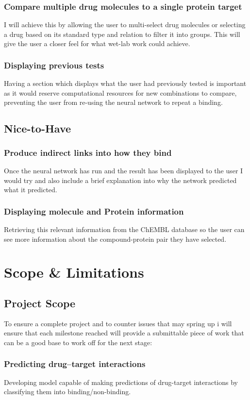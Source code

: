 \subsubsection{Compare multiple drug molecules to a single protein target}
I will achieve this by allowing the user to multi-select drug molecules or selecting a drug based on its standard type and relation to filter it into groups. This will give the user a closer feel for what wet-lab work could achieve.
\subsubsection{Displaying previous tests}
Having a section which displays what the user had previously tested is important as it would reserve computational resources for new combinations to compare, preventing the user from re-using the neural network to repeat a binding.


\subsection{Nice-to-Have}
\subsubsection{Produce indirect links into how they bind}
Once the neural network has run and the result has been displayed to the user I would try and also include a brief explanation into why the network predicted what it predicted.
\subsubsection{Displaying molecule and Protein information}
Retrieving this relevant information from the ChEMBL database so the user can see more information about the compound-protein pair they have selected.



\section{Scope \& Limitations}
\subsection{Project Scope}
To ensure a complete project and to counter issues that may spring up i will ensure that each milestone reached will provide a submittable piece of work that can be a good base to work off for the next stage:
\subsubsection{Predicting drug–target interactions}
Developing  model capable of making predictions of drug-target interactions by classifying them into binding/non-binding. 

